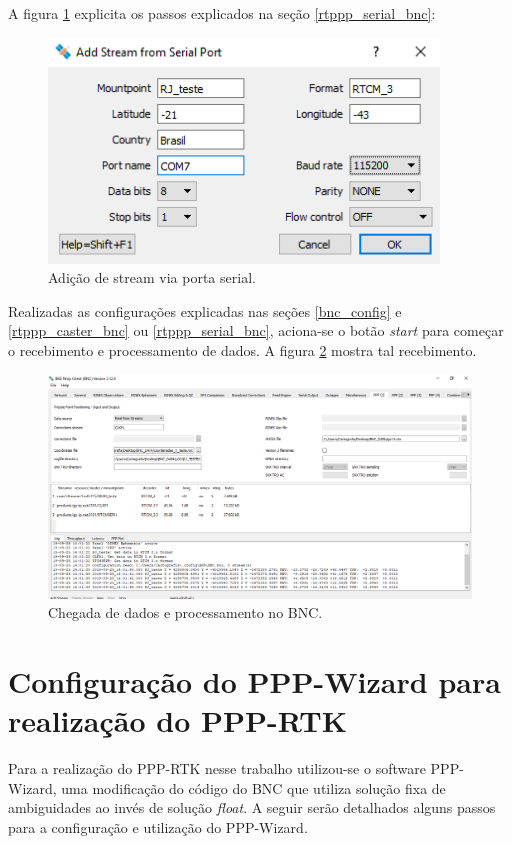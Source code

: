 A figura \ref{bnc_stream_serial} explicita os passos explicados na seção \ref{rtppp_serial_bnc}:
\begin{figure}[H]
\centering
\includegraphics[scale=0.4]{img/BNC_19.png} %
\caption{Adição de stream via porta serial.}
\label{bnc_stream_serial}
\end{figure}

Realizadas as configurações explicadas nas seções \ref{bnc_config} e \ref{rtppp_caster_bnc} ou \ref{rtppp_serial_bnc}, aciona-se o botão \textit{start} para começar o recebimento e processamento de dados. A figura \ref{receb_dados_bnc} mostra tal recebimento.

\begin{figure}[H]
\centering
\includegraphics[scale=0.4]{img/BNC_21.png} 
\caption{Chegada de dados e processamento no BNC.}
\label{receb_dados_bnc}
\end{figure}

\section{Configuração do PPP-Wizard para realização do PPP-RTK}

Para a realização do PPP-RTK nesse trabalho utilizou-se o software PPP-Wizard, uma modificação do código do BNC que utiliza solução fixa de ambiguidades ao invés de solução \textit{float}. A seguir serão detalhados alguns passos para a configuração e utilização do PPP-Wizard.

